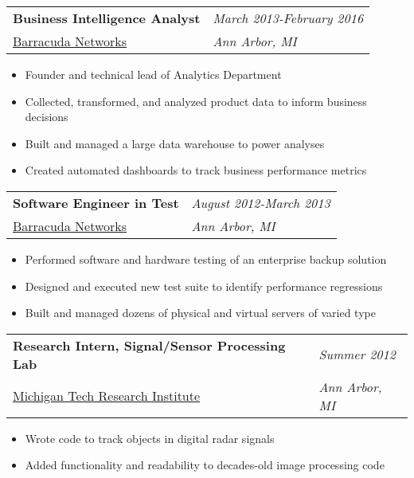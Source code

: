 \documentclass[margin,line]{res}
\begin{document}
\begin{resume}
\begin{tabular}{p{4.4in} l}
  {\bf Business Intelligence Analyst} & \emph{March 2013-February 2016}\\
  \href{https://www.barracuda.com/}{Barracuda Networks} & \emph{Ann Arbor, MI}
\end{tabular}
\vspace{2pt}
\begin{itemize}\itemsep -2pt
  \item Founder and technical lead of Analytics Department
  \item Collected, transformed, and analyzed product data to inform business decisions
  \item Built and managed a large data warehouse to power analyses
  \item Created automated dashboards to track business performance metrics
\end{itemize}

\begin{tabular}{p{4.4in} l}
  {\bf Software Engineer in Test} & \emph{August 2012-March 2013}\\
  \href{https://www.barracuda.com/}{Barracuda Networks} & \emph{Ann Arbor, MI}
\end{tabular}
\vspace{2pt}
\begin{itemize}\itemsep -2pt
  \item Performed software and hardware testing of an enterprise backup solution
  \item Designed and executed new test suite to identify performance regressions
  \item Built and managed dozens of physical and virtual servers of varied type
\end{itemize}

\begin{tabular}{p{4.4in} l} %
  {\bf Research Intern, Signal/Sensor Processing Lab } &  \emph{Summer 2012}\\
  \href{http://www.mtri.org/}{Michigan Tech Research Institute} & \emph{Ann Arbor, MI}
\end{tabular}
\vspace{2pt}
\begin{itemize}\itemsep -2pt %
  \item Wrote code to track objects in digital radar signals
  \item Added functionality and readability to decades-old image processing code
\end{itemize}


\end{resume}
\end{document}
